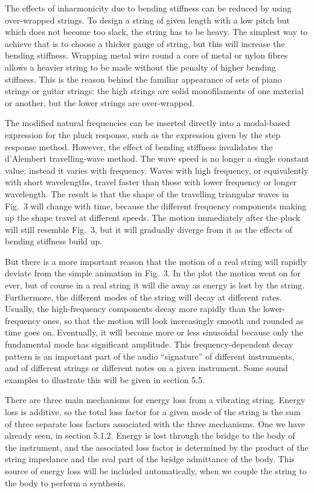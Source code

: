   The effects of inharmonicity due to bending stiffness can be reduced by using 
  over-wrapped strings. To design a string of given length with a low pitch but 
  which does not become too slack, the string has to be heavy. The simplest way 
  to achieve that is to choose a thicker gauge of string, but this will 
  increase the bending stiffness. Wrapping metal wire round a core of metal or 
  nylon fibres allows a heavier string to be made without the penalty of higher 
  bending stiffness. This is the reason behind the familiar appearance of sets 
  of piano strings or guitar strings: the high strings are solid monofilaments 
  of one material or another, but the lower strings are over-wrapped. 

  The modified natural frequencies can be inserted directly into a modal-based 
  expression for the pluck response, such as the expression given by the step 
  response method. However, the effect of bending stiffness invalidates the 
  d'Alembert travelling-wave method. The wave speed is no longer a single 
  constant value; instead it varies with frequency. Waves with high frequency, 
  or equivalently with short wavelengths, travel faster than those with lower 
  frequency or longer wavelength. The result is that the shape of the 
  travelling triangular waves in Fig.\ 3 will change with time, because the 
  different frequency components making up the shape travel at different 
  speeds. The motion immediately after the pluck will still resemble Fig.\ 3, 
  but it will gradually diverge from it as the effects of bending stiffness 
  build up. 

  But there is a more important reason that the motion of a real string will 
  rapidly deviate from the simple animation in Fig.\ 3. In the plot the motion 
  went on for ever, but of course in a real string it will die away as energy 
  is lost by the string. Furthermore, the different modes of the string will 
  decay at different rates. Usually, the high-frequency components decay more 
  rapidly than the lower-frequency ones, so that the motion will look 
  increasingly smooth and rounded as time goes on. Eventually, it will become 
  more or less sinusoidal because only the fundamental mode has significant 
  amplitude. This frequency-dependent decay pattern is an important part of the 
  audio ``signature'' of different instruments, and of different strings or 
  different notes on a given instrument. Some sound examples to illustrate this 
  will be given in section 5.5. 

  There are three main mechanisms for energy loss from a vibrating string. 
  Energy loss is additive, so the total loss factor for a given mode of the 
  string is the sum of three separate loss factors associated with the three 
  mechanisms. One we have already seen, in section 5.1.2. Energy is lost 
  through the bridge to the body of the instrument, and the associated loss 
  factor is determined by the product of the string impedance and the real part 
  of the bridge admittance of the body. This source of energy loss will be 
  included automatically, when we couple the string to the body to perform a 
  synthesis. 

